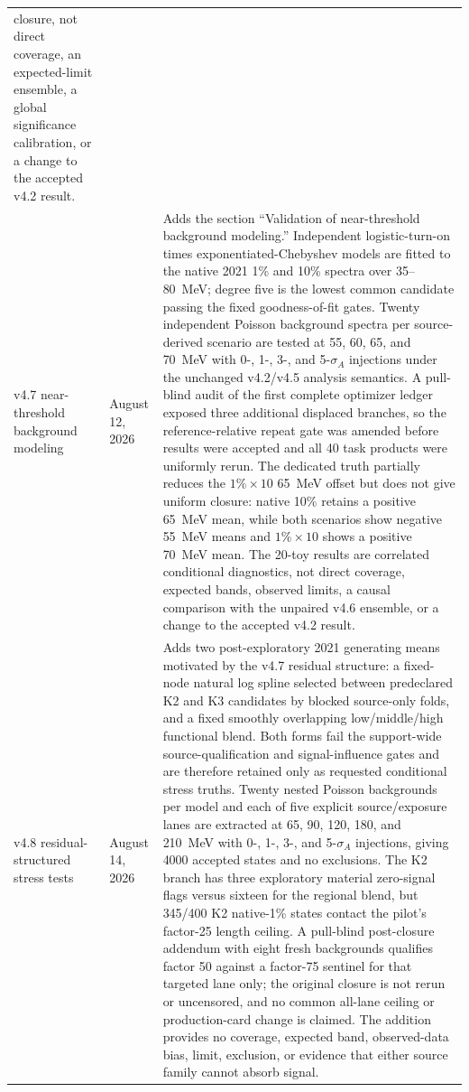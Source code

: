 \begin{longtable}{P{0.11\textwidth}P{0.16\textwidth}P{0.64\textwidth}}
closure, not direct \CLs{} coverage, an expected-limit ensemble, a global
significance calibration, or a change to the accepted v4.2 result. \\
\addlinespace
v4.7 near-threshold background modeling & August 12, 2026 &
Adds the section ``Validation of near-threshold background modeling.''
Independent logistic-turn-on times exponentiated-Chebyshev models are fitted
to the native 2021 1\% and 10\% spectra over 35--80~MeV; degree five is the
lowest common candidate passing the fixed goodness-of-fit gates.  Twenty
independent Poisson background spectra per source-derived scenario are tested
at 55, 60, 65, and 70~MeV with 0-, 1-, 3-, and 5-$\sigma_A$ injections under
the unchanged v4.2/v4.5 analysis semantics.  A pull-blind audit of the first
complete optimizer ledger exposed three additional displaced branches, so
the reference-relative repeat gate was amended before results were accepted
and all 40 task products were uniformly rerun.  The dedicated truth partially
reduces the $1\%\times10$ 65~MeV offset but does not give uniform closure:
native 10\% retains a positive 65~MeV mean, while both scenarios show negative
55~MeV means and $1\%\times10$ shows a positive 70~MeV mean.  The 20-toy
results are correlated conditional diagnostics, not direct coverage, expected
bands, observed limits, a causal comparison with the unpaired v4.6 ensemble,
or a change to the accepted v4.2 result. \\
\addlinespace
v4.8 residual-structured stress tests & August 14, 2026 &
Adds two post-exploratory 2021 generating means motivated by the v4.7 residual
structure: a fixed-node natural log spline selected between predeclared K2 and
K3 candidates by blocked source-only folds, and a fixed smoothly overlapping
low/middle/high functional blend.  Both forms fail the support-wide
source-qualification and signal-influence gates and are therefore retained
only as requested conditional stress truths.  Twenty nested Poisson
backgrounds per model and each of five explicit source/exposure lanes are
extracted at 65, 90, 120, 180, and 210~MeV with 0-, 1-, 3-, and
5-$\sigma_A$ injections, giving 4000 accepted states and no exclusions.  The
K2 branch has three exploratory material zero-signal flags versus sixteen for
the regional blend, but 345/400 K2 native-1\% states contact the pilot's
factor-25 length ceiling.  A pull-blind post-closure addendum with eight fresh
backgrounds qualifies factor 50 against a factor-75 sentinel for that targeted
lane only; the original closure is not rerun or uncensored, and no common
all-lane ceiling or production-card change is claimed.  The addition provides
no coverage, expected band, observed-data bias, limit, exclusion, or evidence
that either source family cannot absorb signal. \\
\end{longtable}
\endgroup
